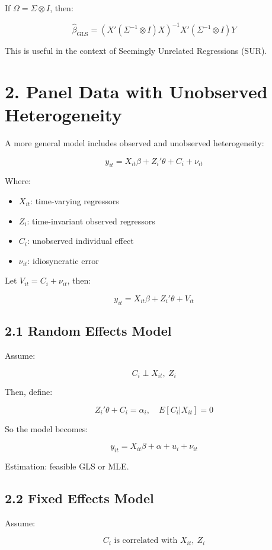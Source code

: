 \documentclass[12pt, oneside]{article}
\begin{document}
If \( \Omega = \Sigma \otimes I \), then:

\[
\hat{\beta}_{\text{GLS}} = \left( X' (\Sigma^{-1} \otimes I) X \right)^{-1} X' (\Sigma^{-1} \otimes I) Y
\]

This is useful in the context of Seemingly Unrelated Regressions (SUR).

\section*{2. Panel Data with Unobserved Heterogeneity}

A more general model includes observed and unobserved heterogeneity:

\[
y_{it} = X_{it} \beta + Z_i' \theta + C_i + \nu_{it}
\]

Where:
\begin{itemize}
  \item \( X_{it} \): time-varying regressors
  \item \( Z_i \): time-invariant observed regressors
  \item \( C_i \): unobserved individual effect
  \item \( \nu_{it} \): idiosyncratic error
\end{itemize}

Let \( V_{it} = C_i + \nu_{it} \), then:

\[
y_{it} = X_{it} \beta + Z_i' \theta + V_{it}
\]

\subsection*{2.1 Random Effects Model}

Assume:

\[
C_i \perp X_{it},\ Z_i
\]

Then, define:

\[
Z_i' \theta + C_i = \alpha_i, \quad E[C_i | X_{it}] = 0
\]

So the model becomes:

\[
y_{it} = X_{it} \beta + \alpha + u_i + \nu_{it}
\]

Estimation: feasible GLS or MLE.

\subsection*{2.2 Fixed Effects Model}

Assume:

\[
C_i \text{ is correlated with } X_{it},\ Z_i
\]
\end{document}
